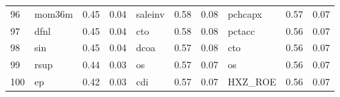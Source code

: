 \documentclass[12pt]{article}
\begin{document}
\begin{landscape}
\begin{footnotesize}
\begin{longtable}{l|lcc|lcc|lcc}
			96                    & mom36m                      & 0.45                                                                                 & 0.04                            & saleinv                     & 0.58                                                                                 & 0.08                            & pchcapx                     & 0.57                                                                                 & 0.07                           \\
			97                    & dfnl                        & 0.45                                                                                 & 0.04                            & cto                         & 0.58                                                                                 & 0.08                            & pctacc                      & 0.56                                                                                 & 0.07                           \\
			98                    & sin                         & 0.45                                                                                 & 0.04                            & dcoa                        & 0.57                                                                                 & 0.08                            & cto                         & 0.56                                                                                 & 0.07                           \\
			99                    & rsup                        & 0.44                                                                                 & 0.03                            & os                          & 0.57                                                                                 & 0.07                            & os                          & 0.56                                                                                 & 0.07                           \\
			100                   & ep                          & 0.42                                                                                 & 0.03                            & cdi                         & 0.57                                                                                 & 0.07                            & HXZ\_ROE                    & 0.56                                                                                 & 0.07                           \\

\end{longtable}
\end{footnotesize}
\end{landscape}
\end{document}
